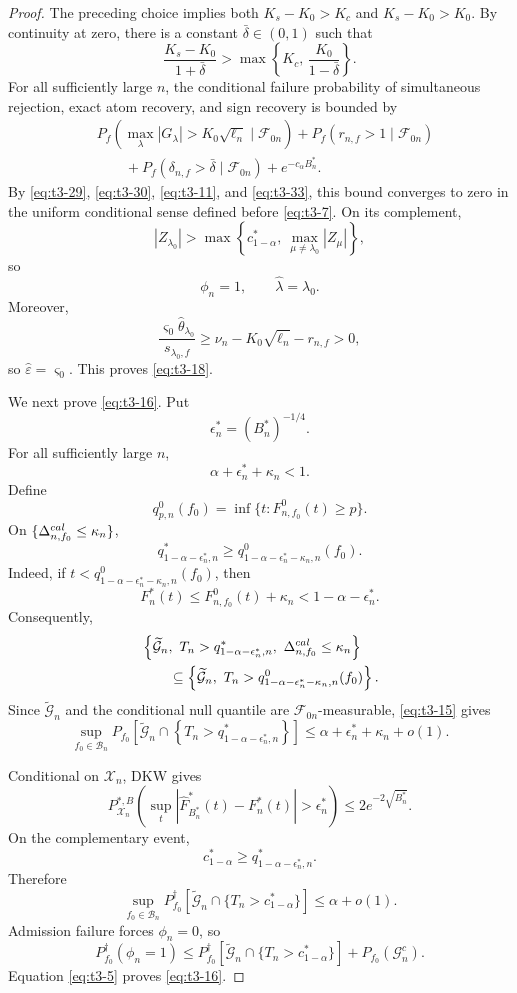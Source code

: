 \documentclass[10pt,a4paper]{amsart}
\begin{document}
\begin{proof}
The preceding choice implies both
\(K_s-K_0>K_c\) and \(K_s-K_0>K_0\).
By continuity at zero, there is a constant
\(\bar\delta\in(0,1)\) such that
\[
\frac{K_s-K_0}{1+\bar\delta}
>
\max\left\{
K_c,\,
\frac{K_0}{1-\bar\delta}
\right\}.
\]
For all sufficiently large \(n\), the conditional failure probability
of simultaneous rejection, exact atom recovery, and sign recovery is
bounded by
\begin{align*}
&
P_f\left(
\max_\lambda|G_\lambda|>K_0\sqrt{\ell_n}
\mid\mathcal F_{0n}
\right)
+
P_f(r_{n,f}>1\mid\mathcal F_{0n})\\
&\qquad
+
P_f(\delta_{n,f}>\bar\delta\mid\mathcal F_{0n})
+
e^{-c_\alpha B_n^*}.
\end{align*}
By \eqref{eq:t3-29}, \eqref{eq:t3-30}, \eqref{eq:t3-11}, and
\eqref{eq:t3-33}, this bound converges to zero in the uniform
conditional sense defined before \eqref{eq:t3-7}.  On its complement,
\[
|Z_{\lambda_0}|
>
\max\left\{
c_{1-\alpha}^*,\
\max_{\mu\ne\lambda_0}|Z_\mu|
\right\},
\]
so
\[
\phi_n=1,
\qquad
\widehat\lambda=\lambda_0.
\]
Moreover,
\[
\frac{
\varsigma_0\widehat\theta_{\lambda_0}
}{
s_{\lambda_0,f}
}
\ge
\nu_n-K_0\sqrt{\ell_n}-r_{n,f}>0,
\]
so \(\widehat\varepsilon=\varsigma_0\).  This proves
\eqref{eq:t3-18}.

We next prove \eqref{eq:t3-16}.  Put
\[
\epsilon_n^*=(B_n^*)^{-1/4}.
\]
For all sufficiently large \(n\),
\[
\alpha+\epsilon_n^*+\kappa_n<1.
\]
Define
\[
q_{p,n}^{0}(f_0)
=
\inf\{t:F_{n,f_0}^{0}(t)\ge p\}.
\]
On
\(\{\Delta_{n,f_0}^{\rm cal}\le\kappa_n\}\),
\[
q_{1-\alpha-\epsilon_n^*,n}^*
\ge
q_{1-\alpha-\epsilon_n^*-\kappa_n,n}^{0}(f_0).
\]
Indeed, if
\(t<q_{1-\alpha-\epsilon_n^*-\kappa_n,n}^{0}(f_0)\), then
\[
F_n^*(t)
\le
F_{n,f_0}^{0}(t)+\kappa_n
<
1-\alpha-\epsilon_n^*.
\]
Consequently,
\begin{align*}
&
\left\{
\widetilde{\mathcal G}_n,\
T_n>q_{1-\alpha-\epsilon_n^*,n}^*,\
\Delta_{n,f_0}^{\rm cal}\le\kappa_n
\right\}\\
&\qquad\subseteq
\left\{
\widetilde{\mathcal G}_n,\
T_n>
q_{1-\alpha-\epsilon_n^*-\kappa_n,n}^{0}(f_0)
\right\}.
\end{align*}
Since \(\widetilde{\mathcal G}_n\) and the conditional null quantile
are \(\mathcal F_{0n}\)-measurable, \eqref{eq:t3-15} gives
\[
\sup_{f_0\in\mathcal B_n}
P_{f_0}\left[
\widetilde{\mathcal G}_n
\cap
\left\{
T_n>
q_{1-\alpha-\epsilon_n^*,n}^*
\right\}
\right]
\le
\alpha+\epsilon_n^*+\kappa_n+o(1).
\]

Conditional on \(\mathcal X_n\), DKW gives
\[
P_{\mathcal X_n}^{*,B}\left(
\sup_t
|\widehat F_{B_n^*}^*(t)-F_n^*(t)|
>
\epsilon_n^*
\right)
\le
2e^{-2\sqrt{B_n^*}}.
\]
On the complementary event,
\[
c_{1-\alpha}^*
\ge
q_{1-\alpha-\epsilon_n^*,n}^*.
\]
Therefore
\[
\sup_{f_0\in\mathcal B_n}
P_{f_0}^\dagger\left[
\widetilde{\mathcal G}_n
\cap
\{T_n>c_{1-\alpha}^*\}
\right]
\le
\alpha+o(1).
\]
Admission failure forces \(\phi_n=0\), so
\[
P_{f_0}^\dagger(\phi_n=1)
\le
P_{f_0}^\dagger\left[
\widetilde{\mathcal G}_n
\cap
\{T_n>c_{1-\alpha}^*\}
\right]
+
P_{f_0}(\mathcal G_n^c).
\]
Equation \eqref{eq:t3-5} proves \eqref{eq:t3-16}.


\end{proof}
\end{document}
